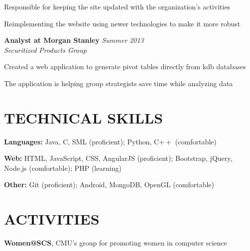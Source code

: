 \documentclass[margin, 11pt]{res} %
\begin{document}
\begin{resume}
\begin{itemize} \itemsep -2pt
{\small \item Responsible for keeping the site updated with the organization's activities 
\item Reimplementing the website using newer technologies to make it more robust}
\end{itemize}

\vspace{3pt}

{\bf Analyst at Morgan Stanley} \hfill {\sl Summer 2013} \\
{\sl Securitized Products Group}
\begin{itemize} \itemsep -2pt %
{\small \item Created a web application to generate pivot tables directly from kdb databases 
\item The application is helping group strategists save time while analyzing data}
\end{itemize}
 

\section{TECHNICAL SKILLS} 

{\bf Languages:} 
Java, C, SML (proficient); Python, C$++$ (comfortable)

\vspace{5pt}

{\bf Web:}
HTML, JavaScript, CSS, AngularJS (proficient); Bootstrap, jQuery, Node.js (comfortable); PHP (learning)

\vspace{5pt}

{\bf Other:}
Git (proficient); Android, MongoDB, OpenGL (comfortable)


\section{ACTIVITIES} 

{\bf Women@SCS}, CMU's group for promoting women in computer science


\end{resume}
\end{document}

